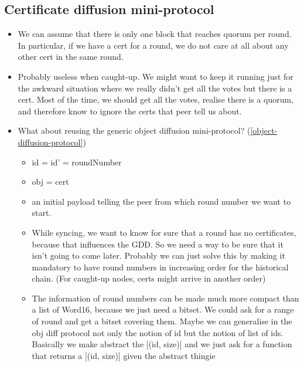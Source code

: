 \subsection{Certificate diffusion mini-protocol}

\begin{itemize}
\item We can assume that there is only one block that reaches quorum per round.
  In particular, if we have a cert for a round, we do not care at all about any
  other cert in the same round.

\item Probably useless when caught-up. We might want to keep it running just for
  the awkward situation where we really didn’t get all the votes but there is a
  cert. Most of the time, we should get all the votes, realise there is a
  quorum, and therefore know to ignore the certs that peer tell us about.

\item What about reusing the generic object diffusion mini-protocol?
  (\autoref{object-diffusion-protocol})
  \begin{itemize}
  \item id = id’ = roundNumber

  \item obj = cert

  \item an initial payload telling the peer from which round number we want to
    start.

  \item While syncing, we want to know for sure that a round has no
    certificates, because that influences the GDD. So we need a way to be sure
    that it isn’t going to come later. Probably we can just solve this by making
    it mandatory to have round numbers in increasing order for the historical
    chain. (For caught-up nodes, certs might arrive in another order)

  \item The information of round numbers can be made much more compact than a
    list of Word16, because we just need a bitset. We could ask for a range of
    round and get a bitset covering them. Maybe we can generalise in the obj
    diff protocol not only the notion of id but the notion of list of ids.
    Basically we make abstract the [(id, size)] and we just ask for a function
    that returns a [(id, size)] given the abstract thingie
  \end{itemize}
\end{itemize}
